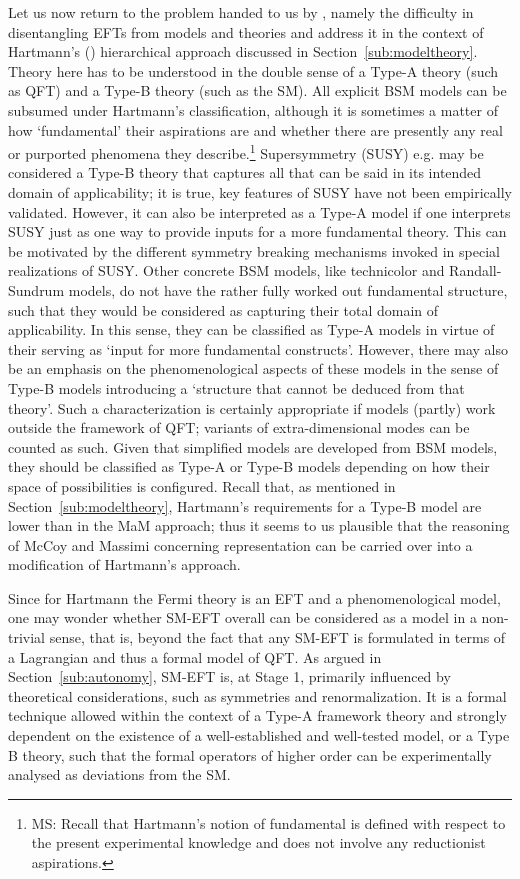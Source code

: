 Let us now return to the problem handed to us by \citet{hartmann2001}, namely the difficulty in disentangling EFTs from models and theories and address it in the context of Hartmann's (\citeyear{hartmann95}) hierarchical approach discussed in Section~\ref{sub:modeltheory}. 
Theory here has to be understood in the double sense of a Type-A theory (such as QFT) and a Type-B theory (such as the SM). 
All explicit BSM models can be subsumed under Hartmann's classification, although it is sometimes a matter of how `fundamental' their aspirations are and whether there are presently any real or purported phenomena they describe.\footnote{MS: Recall that Hartmann's notion of fundamental is defined with respect to the present experimental knowledge and does not involve any reductionist aspirations.}
Supersymmetry (SUSY) e.g. may be considered a Type-B theory %
that captures all that can be said in its intended domain of applicability; it is true, key features of SUSY have not been empirically validated. 
However, it can also be interpreted as a Type-A model if one interprets SUSY just as one way to provide inputs for a more fundamental theory. 
This can be motivated by the different symmetry breaking mechanisms invoked in special realizations of SUSY. 
Other concrete BSM models, like technicolor and Randall-Sundrum models, do not have the rather fully worked out fundamental structure, such that they would be considered as capturing their total domain of applicability. 
In this sense, they can be classified as Type-A models in virtue of their serving as `input for more fundamental constructs'. 
However, there may also be an emphasis on the phenomenological aspects of these models in the sense of Type-B models introducing a `structure that cannot be deduced from that theory'. 
Such a characterization is certainly appropriate if models (partly) work outside the framework of QFT; variants of extra-dimensional modes can be counted as such. 
Given that simplified models are developed from BSM models, they should be classified as Type-A or Type-B models depending on how their space of possibilities is configured.
Recall that, as mentioned in Section~\ref{sub:modeltheory}, Hartmann's requirements for a Type-B model are lower than in the MaM approach; thus it seems to us plausible that the reasoning of McCoy and Massimi concerning representation can be carried over into a modification of Hartmann's approach.

Since for Hartmann the Fermi theory is an EFT and a phenomenological model, one may wonder whether SM-EFT overall can be considered as a model in a non-trivial sense, that is, beyond the fact that any SM-EFT is formulated in terms of a Lagrangian and thus a formal model of QFT.
As argued in Section~\ref{sub:autonomy}, SM-EFT is, at Stage 1, primarily influenced by theoretical considerations, such as symmetries and renormalization. 
It is a formal technique allowed within the context of a Type-A framework theory and strongly dependent on the existence of a well-established and well-tested model, or a Type B theory, such that the formal operators of higher order can be experimentally analysed as deviations from the SM. 

